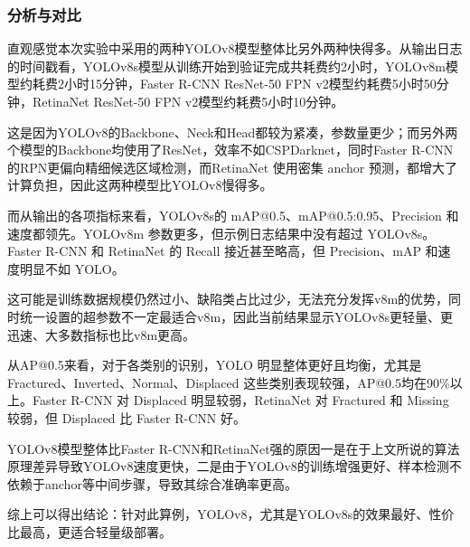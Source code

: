 \documentclass[12pt, oneside, a4paper]{ctexart}
\begin{document}
\subsubsection{分析与对比}
\par{}
直观感觉本次实验中采用的两种YOLOv8模型整体比另外两种快得多。从输出日志的时间戳看，YOLOv8s模型从训练开始到验证完成共耗费约2小时，YOLOv8m模型约耗费2小时15分钟，Faster R-CNN ResNet-50 FPN v2模型约耗费5小时50分钟，RetinaNet ResNet-50 FPN v2模型约耗费5小时10分钟。
\par{}
这是因为YOLOv8的Backbone、Neck和Head都较为紧凑，参数量更少；而另外两个模型的Backbone均使用了ResNet，效率不如CSPDarknet，同时Faster R-CNN 的RPN更偏向精细候选区域检测，而RetinaNet 使用密集 anchor 预测，都增大了计算负担，因此这两种模型比YOLOv8慢得多。
\par{}
而从输出的各项指标来看，YOLOv8s的 mAP@0.5、mAP@0.5:0.95、Precision 和速度都领先。YOLOv8m 参数更多，但示例日志结果中没有超过 YOLOv8s。Faster R-CNN 和 RetinaNet 的 Recall 接近甚至略高，但 Precision、mAP 和速度明显不如 YOLO。
\par{}
这可能是训练数据规模仍然过小、缺陷类占比过少，无法充分发挥v8m的优势，同时统一设置的超参数不一定最适合v8m，因此当前结果显示YOLOv8s更轻量、更迅速、大多数指标也比v8m更高。
\par{}
从AP@0.5来看，对于各类别的识别，YOLO 明显整体更好且均衡，尤其是 Fractured、Inverted、Normal、Displaced 这些类别表现较强，AP@0.5均在90\%以上。Faster R-CNN 对 Displaced 明显较弱，RetinaNet 对 Fractured 和 Missing 较弱，但 Displaced 比 Faster R-CNN 好。
\par{}
YOLOv8模型整体比Faster R-CNN和RetinaNet强的原因一是在于上文所说的算法原理差异导致YOLOv8速度更快，二是由于YOLOv8的训练增强更好、样本检测不依赖于anchor等中间步骤，导致其综合准确率更高。
\par{}
综上可以得出结论：针对此算例，YOLOv8，尤其是YOLOv8s的效果最好、性价比最高，更适合轻量级部署。
\par{}
\quad{}
\par{}
\newpage{}
\end{document}
